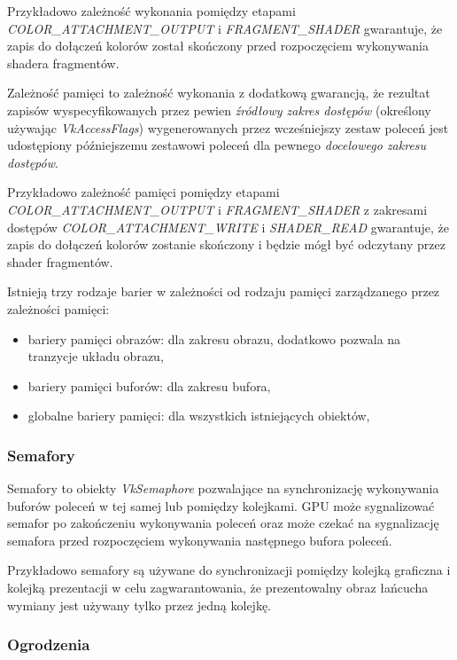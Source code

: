 Przykładowo zależność wykonania pomiędzy etapami
\textit{COLOR\_ATTACHMENT\_OUTPUT} i \textit{FRAGMENT\_SHADER} gwarantuje, że zapis do dołączeń kolorów został skończony przed rozpoczęciem
wykonywania shadera fragmentów.

Zależność pamięci to zależność wykonania z dodatkową gwarancją, że rezultat zapisów wyspecyfikowanych przez pewien \textit{źródłowy
	zakres dostępów} (określony używając \textit{VkAccessFlags}) wygenerowanych przez wcześniejszy zestaw poleceń jest udostępiony
późniejszemu zestawowi poleceń dla pewnego \textit{docelowego zakresu dostępów}.

Przykładowo zależność pamięci pomiędzy etapami
\textit{COLOR\_ATTACHMENT\_OUTPUT} i \textit{FRAGMENT\_SHADER} z zakresami dostępów \textit{COLOR\_ATTACHMENT\_WRITE} i \textit{SHADER\_READ} gwarantuje, że zapis
do dołączeń kolorów zostanie skończony i będzie mógł być odczytany przez shader fragmentów.

Istnieją trzy rodzaje barier w zależności od rodzaju pamięci zarządzanego przez zależności pamięci:

\begin{itemize}
	\item {bariery pamięci obrazów}: dla zakresu obrazu, dodatkowo pozwala na tranzycje układu obrazu,
	\item {bariery pamięci buforów}: dla zakresu bufora,
	\item {globalne bariery pamięci}: dla wszystkich istniejących obiektów,
\end{itemize}

\subsubsection{Semafory}

Semafory to obiekty \textit{VkSemaphore} pozwalające na synchronizację wykonywania buforów poleceń w tej samej lub pomiędzy kolejkami. GPU
może sygnalizować semafor po zakończeniu wykonywania poleceń oraz może czekać na sygnalizację semafora przed
rozpoczęciem wykonywania następnego bufora poleceń.

Przykładowo semafory są używane do synchronizacji pomiędzy kolejką
graficzna i kolejką prezentacji w celu zagwarantowania, że prezentowalny obraz łańcucha wymiany jest używany tylko przez jedną kolejkę.

\subsubsection{Ogrodzenia}


